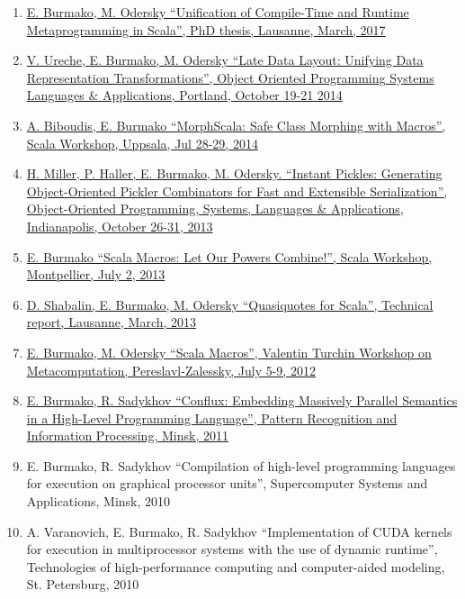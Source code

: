 \documentclass[margin, 10pt]{Stylesheet}
\begin{document}
\begin{resume}
\begin{enumerate} \itemsep -2pt
\item \href{https://infoscience.epfl.ch/record/226166}{E. Burmako, M. Odersky ``Unification of Compile-Time and Runtime Metaprogramming in Scala'', PhD thesis, Lausanne, March, 2017}
\item \href{https://infoscience.epfl.ch/record/200963}{V. Ureche, E. Burmako, M. Odersky ``Late Data Layout: Unifying Data Representation Transformations'', Object Oriented Programming Systems Languages \& Applications, Portland, October 19-21 2014}
\item \href{http://scalamacros.org/paperstalks/2014-07-29-MorphScala.pdf}{A. Biboudis, E. Burmako ``MorphScala: Safe Class Morphing with Macros'', Scala Workshop, Uppsala, Jul 28-29, 2014}
\item \href{http://infoscience.epfl.ch/record/187787}{H. Miller, P. Haller, E. Burmako, M. Odersky. ``Instant Pickles: Generating Object-Oriented Pickler Combinators for Fast and Extensible Serialization'', Object-Oriented Programming, Systems, Languages \& Applications, Indianapolis, October 26-31, 2013}
\item \href{https://infoscience.epfl.ch/record/186844}{E. Burmako ``Scala Macros: Let Our Powers Combine!'', Scala Workshop, Montpellier, July 2, 2013}
\item \href{https://infoscience.epfl.ch/record/185242}{D. Shabalin, E. Burmako, M. Odersky ``Quasiquotes for Scala'', Technical report, Lausanne, March, 2013}
\item \href{http://infoscience.epfl.ch/record/183862}{E. Burmako, M. Odersky ``Scala Macros'', Valentin Turchin Workshop on Metacomputation, Pereslavl-Zalessky, July 5-9, 2012}
\item \href{https://code.google.com/archive/p/conflux/downloads}{E. Burmako, R. Sadykhov ``Conflux: Embedding Massively Parallel Semantics in a High-Level Programming Language'', Pattern Recognition and Information Processing, Minsk, 2011}
\item E. Burmako, R. Sadykhov ``Compilation of high-level programming languages for execution on graphical processor units'', Supercomputer Systems and Applications, Minsk, 2010
\item A. Varanovich, E. Burmako, R. Sadykhov ``Implementation of CUDA kernels for execution in multiprocessor systems with the use of dynamic runtime'', Technologies of high-performance computing and computer-aided modeling, St. Petersburg, 2010
\end{enumerate}

\end{resume}
\end{document}
